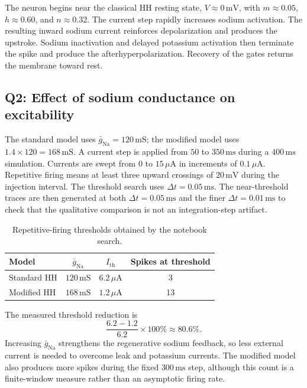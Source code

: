 \documentclass[12pt,a4paper]{article}
\begin{document}
The neuron begins near the classical HH resting state, $V\approx0\,\mathrm{mV}$,
with $m\approx0.05$, $h\approx0.60$, and $n\approx0.32$. The current step rapidly
increases sodium activation. The resulting inward sodium current reinforces
 depolarization and produces the upstroke. Sodium inactivation and delayed potassium
activation then terminate the spike and produce the afterhyperpolarization. Recovery of
the gates returns the membrane toward rest.

\subsection*{Q2: Effect of sodium conductance on excitability}
 The standard model uses $\bar g_{\mathrm{Na}}=120\,\mathrm{mS}$; the modified model
uses $1.4\times120=168\,\mathrm{mS}$. A current step is applied from $50$ to
$350\,\mathrm{ms}$ during a $400\,\mathrm{ms}$ simulation. Currents are swept from
$0$ to $15\,\mu\mathrm{A}$ in increments of $0.1\,\mu\mathrm{A}$. Repetitive firing
means at least three upward crossings of $20\,\mathrm{mV}$ during the injection
interval. The threshold search uses $\Delta t=0.05\,\mathrm{ms}$.
The near-threshold traces are then generated at both $\Delta t=0.05\,\mathrm{ms}$
and the finer $\Delta t=0.01\,\mathrm{ms}$ to check that the qualitative comparison
is not an integration-step artifact.

\begin{table}[H]
\centering
\caption{Repetitive-firing thresholds obtained by the notebook search.}
\label{tab:thresholds}
\begin{tabular}{lccc}
\toprule
Model & $\bar g_{\mathrm{Na}}$ & $I_{\mathrm{th}}$ & Spikes at threshold\\
\midrule
Standard HH & $120\,\mathrm{mS}$ & $6.2\,\mu\mathrm{A}$ & 3\\
Modified HH & $168\,\mathrm{mS}$ & $1.2\,\mu\mathrm{A}$ & 13\\
\bottomrule
\end{tabular}
\end{table}

The measured threshold reduction is
\begin{equation}
\frac{6.2-1.2}{6.2}\times100\%\approx80.6\%.
\end{equation}
Increasing $\bar g_{\mathrm{Na}}$ strengthens the regenerative sodium feedback, so
less external current is needed to overcome leak and potassium currents. The modified
model also produces more spikes during the fixed $300\,\mathrm{ms}$ step, although
this count is a finite-window measure rather than an asymptotic firing rate.
\end{document}

